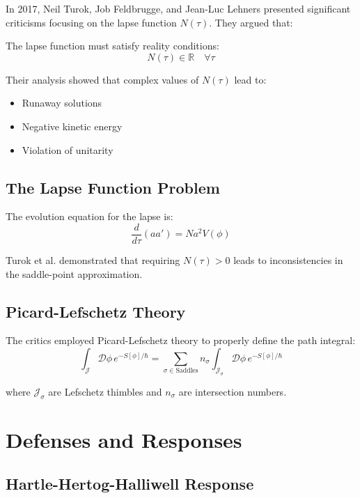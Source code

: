 \documentclass[12pt,a4paper]{article}
\begin{document}
In 2017, Neil Turok, Job Feldbrugge, and Jean-Luc Lehners presented significant criticisms focusing on the lapse function $N(\tau)$. They argued that:

The lapse function must satisfy reality conditions:
\begin{equation}
N(\tau) \in \mathbb{R} \quad \forall \tau
\end{equation}

Their analysis showed that complex values of $N(\tau)$ lead to:
\begin{itemize}
    \item Runaway solutions
    \item Negative kinetic energy
    \item Violation of unitarity
\end{itemize}

\subsection{The Lapse Function Problem}

The evolution equation for the lapse is:
\begin{equation}
\frac{d}{d\tau}\left(aa'\right) = N a^2 V(\phi)
\end{equation}

Turok et al. demonstrated that requiring $N(\tau) > 0$ leads to inconsistencies in the saddle-point approximation.

\subsection{Picard-Lefschetz Theory}

The critics employed Picard-Lefschetz theory to properly define the path integral:
\begin{equation}
\int_{\mathcal{J}} \mathcal{D}\phi \, e^{-S[\phi]/\hbar} = \sum_{\sigma \in \text{Saddles}} n_\sigma \int_{\mathcal{J}_\sigma} \mathcal{D}\phi \, e^{-S[\phi]/\hbar}
\end{equation}

where $\mathcal{J}_\sigma$ are Lefschetz thimbles and $n_\sigma$ are intersection numbers.

\section{Defenses and Responses}

\subsection{Hartle-Hertog-Halliwell Response}
\end{document}
